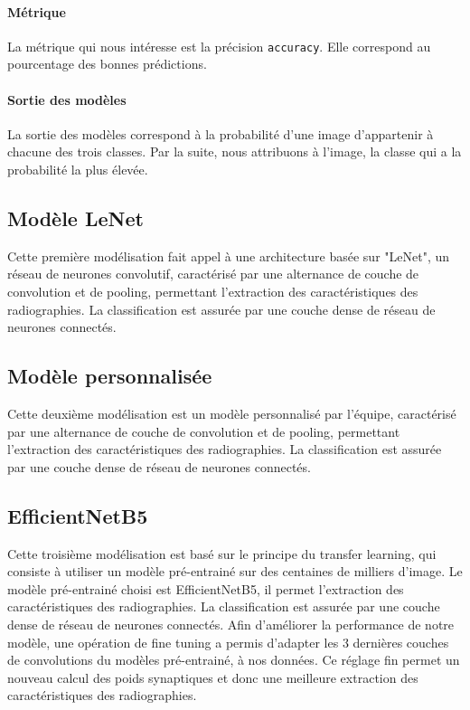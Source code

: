 \documentclass[11pt,twoside,openright]{article}
\def\code#1{\texttt{#1}}
\begin{document}
\paragraph{Métrique}
La métrique qui nous intéresse est la précision \code{accuracy}. Elle correspond au pourcentage des bonnes prédictions.

\paragraph{Sortie des modèles}
La sortie des modèles correspond à la probabilité d'une image d'appartenir à chacune des trois classes. Par la suite, nous attribuons à l'image, la classe qui a la probabilité la plus élevée.



\subsection{Modèle LeNet}

Cette première modélisation fait appel à une architecture basée sur "LeNet", un réseau de neurones convolutif, caractérisé par une alternance de couche de convolution et de pooling, permettant l'extraction des caractéristiques des radiographies. La classification est assurée par une couche dense de réseau de neurones connectés.

\subsection{Modèle personnalisée}

Cette deuxième modélisation est un modèle personnalisé par l'équipe, caractérisé par une alternance de couche de convolution et de pooling, permettant l'extraction des caractéristiques des radiographies. La classification est assurée par une couche dense de réseau de neurones connectés.

\subsection{EfficientNetB5}

Cette troisième modélisation est basé sur le principe du transfer learning, qui consiste à utiliser un modèle pré-entrainé sur des centaines de milliers d'image. Le modèle pré-entrainé choisi est EfficientNetB5, il permet l'extraction des caractéristiques des radiographies. La classification est assurée par une couche dense de réseau de neurones connectés.
Afin d'améliorer la performance de notre modèle, une opération de fine tuning a permis d'adapter les 3 dernières couches de convolutions du modèles pré-entrainé, à nos données. Ce réglage fin permet un  nouveau calcul des poids synaptiques et donc une meilleure extraction des caractéristiques des radiographies.
\end{document}
